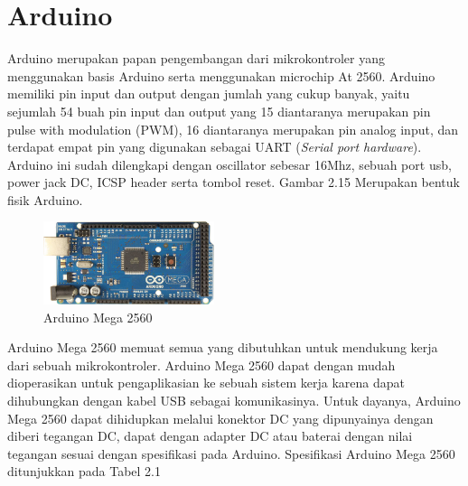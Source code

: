 \section{Arduino}
Arduino  merupakan papan pengembangan dari mikrokontroler yang menggunakan basis Arduino serta menggunakan microchip At 2560. Arduino  memiliki pin input dan output dengan jumlah yang cukup banyak, yaitu sejumlah 54 buah pin input dan output yang 15 diantaranya merupakan pin pulse with modulation (PWM), 16 diantaranya merupakan pin analog input, dan terdapat empat pin yang digunakan sebagai UART (\textit{Serial port hardware}). Arduino ini sudah dilengkapi dengan oscillator sebesar 16Mhz, sebuah port usb, power jack DC, ICSP header serta tombol reset. Gambar 2.15 Merupakan bentuk fisik Arduino.
	\begin{figure}[H]
	\centering
	\includegraphics[width=5cm]{gambar/arduino_mega.jpg}
	\caption{Arduino Mega 2560}
	\end{figure}

Arduino Mega 2560 memuat semua yang dibutuhkan untuk mendukung kerja dari sebuah mikrokontroler. Arduino Mega 2560 dapat dengan mudah dioperasikan untuk pengaplikasian ke sebuah sistem kerja karena dapat dihubungkan dengan kabel USB sebagai komunikasinya. Untuk dayanya, Arduino Mega 2560 dapat dihidupkan melalui konektor DC yang dipunyainya dengan diberi tegangan DC, dapat dengan adapter DC atau baterai dengan nilai tegangan sesuai dengan spesifikasi pada Arduino. Spesifikasi Arduino Mega 2560 ditunjukkan pada Tabel 2.1
\begin{table}[H]
	\centering
	\caption{ Spesifikasi Arduino Mega 2560 }
\end{table}

